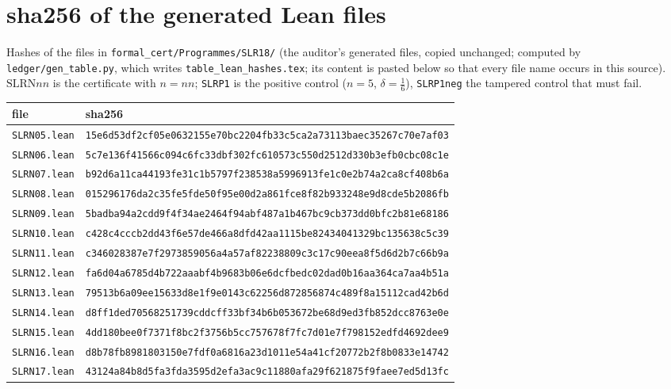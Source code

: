 \documentclass[10pt]{article}
\begin{document}
\section{sha256 of the generated Lean files}\label{sec:hashes}
Hashes of the files in \texttt{formal\_cert/Programmes/SLR18/} (the auditor's generated files, copied unchanged; computed by \texttt{ledger/gen\_table.py}, which writes \texttt{table\_lean\_hashes.tex}; its content is pasted below so that every file name occurs in this source). $\mathrm{SLRN}nn$ is the certificate with $n=nn$; \texttt{SLRP1} is the positive control ($n=5$, $\delta=\frac16$), \texttt{SLRP1neg} the tampered control that must fail.
\begin{center}\scriptsize\begin{tabular}{ll}\toprule
file & sha256\\\midrule
\texttt{SLRN05.lean} & \texttt{15e6d53df2cf05e0632155e70bc2204fb33c5ca2a73113baec35267c70e7af03}\\
\texttt{SLRN06.lean} & \texttt{5c7e136f41566c094c6fc33dbf302fc610573c550d2512d330b3efb0cbc08c1e}\\
\texttt{SLRN07.lean} & \texttt{b92d6a11ca44193fe31c1b5797f238538a5996913fe1c0e2b74a2ca8cf408b6a}\\
\texttt{SLRN08.lean} & \texttt{015296176da2c35fe5fde50f95e00d2a861fce8f82b933248e9d8cde5b2086fb}\\
\texttt{SLRN09.lean} & \texttt{5badba94a2cdd9f4f34ae2464f94abf487a1b467bc9cb373dd0bfc2b81e68186}\\
\texttt{SLRN10.lean} & \texttt{c428c4cccb2dd43f6e57de466a8dfd42aa1115be82434041329bc135638c5c39}\\
\texttt{SLRN11.lean} & \texttt{c346028387e7f2973859056a4a57af82238809c3c17c90eea8f5d6d2b7c66b9a}\\
\texttt{SLRN12.lean} & \texttt{fa6d04a6785d4b722aaabf4b9683b06e6dcfbedc02dad0b16aa364ca7aa4b51a}\\
\texttt{SLRN13.lean} & \texttt{79513b6a09ee15633d8e1f9e0143c62256d872856874c489f8a15112cad42b6d}\\
\texttt{SLRN14.lean} & \texttt{d8ff1ded70568251739cddcff33bf34b6b053672be68d9ed3fb852dcc8763e0e}\\
\texttt{SLRN15.lean} & \texttt{4dd180bee0f7371f8bc2f3756b5cc757678f7fc7d01e7f798152edfd4692dee9}\\
\texttt{SLRN16.lean} & \texttt{d8b78fb8981803150e7fdf0a6816a23d1011e54a41cf20772b2f8b0833e14742}\\
\texttt{SLRN17.lean} & \texttt{43124a84b8d5fa3fda3595d2efa3ac9c11880afa29f621875f9faee7ed5d13fc}\\

\end{tabular}
\end{center}
\end{document}

